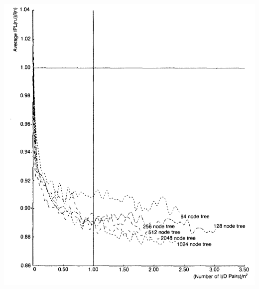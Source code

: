 \documentclass{beamer}
\begin{document}
\begin{frame}[plain]
    \begin{center}
        \includegraphics[width=\paperwidth,height=\paperheight,keepaspectratio]{plotEppingerSym.png}
    \end{center}
\end{frame}
\end{document}
